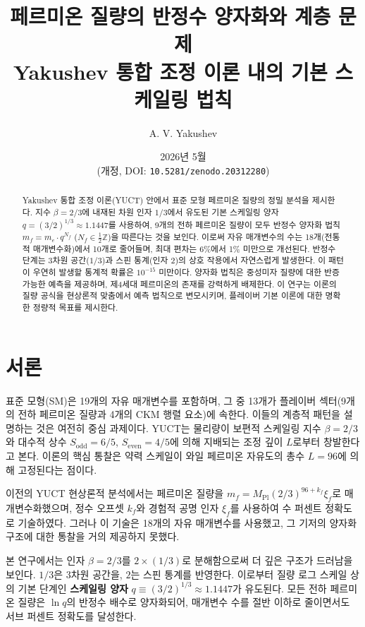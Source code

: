 \documentclass[12pt,a4paper]{article}
\begin{document}
	
	\title{페르미온 질량의 반정수 양자화와 계층 문제 \\
		\large Yakushev 통합 조정 이론 내의 기본 스케일링 법칙}
	\author{A. V. Yakushev}
	\date{2026년 5월 \\ (개정, DOI: \texttt{10.5281/zenodo.20312280})}
	\maketitle
	
	\begin{abstract}
		Yakushev 통합 조정 이론(YUCT) 안에서 표준 모형 페르미온 질량의 정밀 분석을 제시한다. 지수 \(\beta = 2/3\)에 내재된 차원 인자 \(1/3\)에서 유도된 기본 스케일링 양자 \(q = (3/2)^{1/3} \approx 1.1447\)를 사용하여, 9개의 전하 페르미온 질량이 모두 반정수 양자화 법칙 \(m_f = m_e \cdot q^{N_f}\) (\(N_f \in \frac{1}{2}\mathbb{Z}\))을 따른다는 것을 보인다. 이로써 자유 매개변수의 수는 18개(전통적 매개변수화)에서 10개로 줄어들며, 최대 편차는 6\%에서 1\% 미만으로 개선된다. 반정수 단계는 3차원 공간(\(1/3\))과 스핀 통계(인자 2)의 상호 작용에서 자연스럽게 발생한다. 이 패턴이 우연히 발생할 통계적 확률은 \(10^{-15}\) 미만이다. 양자화 법칙은 중성미자 질량에 대한 반증 가능한 예측을 제공하며, 제4세대 페르미온의 존재를 강력하게 배제한다. 이 연구는 이론의 질량 공식을 현상론적 맞춤에서 예측 법칙으로 변모시키며, 플레이버 기본 이론에 대한 명확한 정량적 목표를 제시한다.
	\end{abstract}
	
	\section{서론}
	
	표준 모형(SM)은 19개의 자유 매개변수를 포함하며, 그 중 13개가 플레이버 섹터(9개의 전하 페르미온 질량과 4개의 CKM 행렬 요소)에 속한다. 이들의 계층적 패턴을 설명하는 것은 여전히 중심 과제이다. YUCT는 물리량이 보편적 스케일링 지수 \(\beta = 2/3\)와 대수적 상수 \(S_{\mathrm{odd}}=6/5\), \(S_{\mathrm{even}}=4/5\)에 의해 지배되는 조정 깊이 \(L\)로부터 창발한다고 본다. 이론의 핵심 통찰은 약력 스케일이 와일 페르미온 자유도의 총수 \(L=96\)에 의해 고정된다는 점이다.
	
	이전의 YUCT 현상론적 분석에서는 페르미온 질량을 \(m_f = M_{\mathrm{Pl}}(2/3)^{96+k_f}\xi_f\)로 매개변수화했으며, 정수 오프셋 \(k_f\)와 경험적 공명 인자 \(\xi_f\)를 사용하여 수 퍼센트 정확도로 기술하였다. 그러나 이 기술은 18개의 자유 매개변수를 사용했고, 그 기저의 양자화 구조에 대한 통찰을 거의 제공하지 못했다.
	
	본 연구에서는 인자 \(\beta = 2/3\)를 \(2 \times (1/3)\)로 분해함으로써 더 깊은 구조가 드러남을 보인다. \(1/3\)은 3차원 공간을, \(2\)는 스핀 통계를 반영한다. 이로부터 질량 로그 스케일 상의 기본 단계인 \textbf{스케일링 양자} \(q \equiv (3/2)^{1/3} \approx 1.1447\)가 유도된다. 모든 전하 페르미온 질량은 \(\ln q\)의 반정수 배수로 양자화되어, 매개변수 수를 절반 이하로 줄이면서도 서브 퍼센트 정확도를 달성한다.
	
\end{document}
